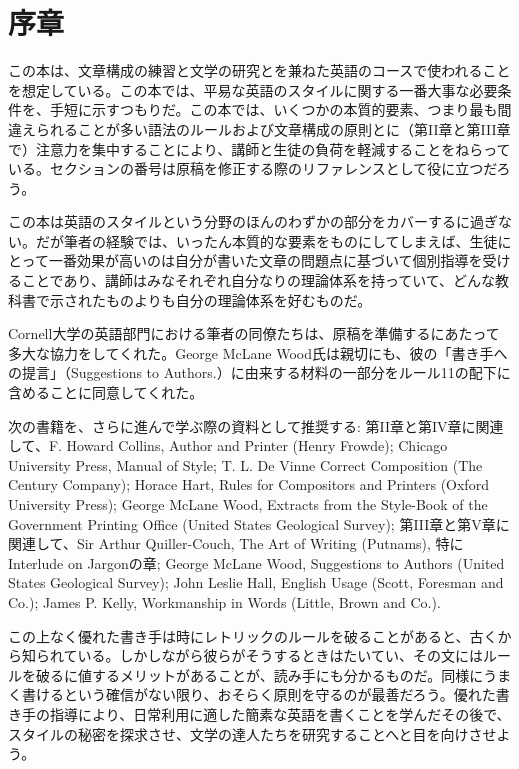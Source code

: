 \chapter{序章}
この本は、文章構成の練習と文学の研究とを兼ねた英語のコースで使われることを想定している。この本では、平易な英語のスタイルに関する一番大事な必要条件を、手短に示すつもりだ。この本では、いくつかの本質的要素、つまり最も間違えられることが多い語法のルールおよび文章構成の原則とに（第II章と第III章で）注意力を集中することにより、講師と生徒の負荷を軽減することをねらっている。セクションの番号は原稿を修正する際のリファレンスとして役に立つだろう。
\par
この本は英語のスタイルという分野のほんのわずかの部分をカバーするに過ぎない。だが筆者の経験では、いったん本質的な要素をものにしてしまえば、生徒にとって一番効果が高いのは自分が書いた文章の問題点に基づいて個別指導を受けることであり、講師はみなそれぞれ自分なりの理論体系を持っていて、どんな教科書で示されたものよりも自分の理論体系を好むものだ。
\par
Cornell大学の英語部門における筆者の同僚たちは、原稿を準備するにあたって多大な協力をしてくれた。George
McLane Wood氏は親切にも、彼の「書き手への提言」（Suggestions to
Authors.）に由来する材料の一部分をルール11の配下に含めることに同意してくれた。
\par
次の書籍を、さらに進んで学ぶ際の資料として推奨する:
第II章と第IV章に関連して、F. Howard Collins, Author and Printer (Henry
Frowde); Chicago University Press, Manual of Style; T. L. De Vinne
Correct Composition (The Century Company); Horace Hart, Rules for
Compositors and Printers (Oxford University Press); George McLane Wood,
Extracts from the Style-Book of the Government Printing Office (United
States Geological Survey); 第III章と第V章に関連して、Sir Arthur
Quiller-Couch, The Art of Writing (Putnams), 特にInterlude on
Jargonの章; George McLane Wood, Suggestions to Authors (United States
Geological Survey); John Leslie Hall, English Usage (Scott, Foresman and
Co.); James P. Kelly, Workmanship in Words (Little, Brown and Co.).
\par
この上なく優れた書き手は時にレトリックのルールを破ることがあると、古くから知られている。しかしながら彼らがそうするときはたいてい、その文にはルールを破るに値するメリットがあることが、読み手にも分かるものだ。同様にうまく書けるという確信がない限り、おそらく原則を守るのが最善だろう。優れた書き手の指導により、日常利用に適した簡素な英語を書くことを学んだその後で、スタイルの秘密を探求させ、文学の達人たちを研究することへと目を向けさせよう。